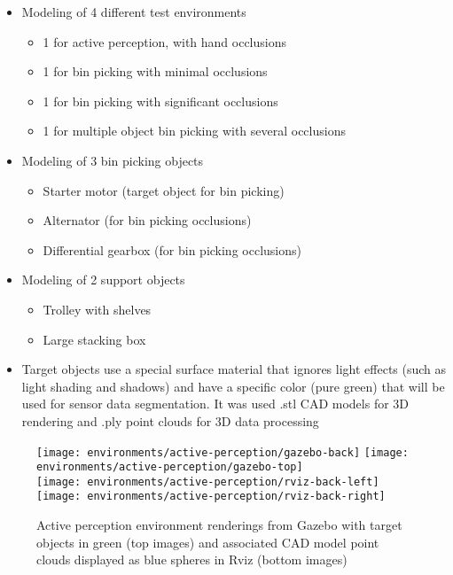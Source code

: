 \begin{itemize}
	\item Modeling of 4 different test environments
	\begin{itemize}
		\item 1 for active perception, with hand occlusions
		\item 1 for bin picking with minimal occlusions
		\item 1 for bin picking with significant occlusions
		\item 1 for multiple object bin picking with several occlusions
	\end{itemize}
	\item Modeling of 3 bin picking objects
	\begin{itemize}
		\item Starter motor (target object for bin picking)
		\item Alternator (for bin picking occlusions)
		\item Differential gearbox (for bin picking occlusions)
	\end{itemize}
	\item Modeling of 2 support objects
	\begin{itemize}
		\item Trolley with shelves
		\item Large stacking box
	\end{itemize}
	\item Target objects use a special surface material that ignores light effects (such as light shading and shadows) and have a specific color (pure green) that will be used for sensor data segmentation. It was used .stl CAD models for 3D rendering and .ply point clouds for 3D data processing
\end{itemize}

\begin{figure}
	\centering
	\texttt{[image: environments/active-perception/gazebo-back]}
	\texttt{[image: environments/active-perception/gazebo-top]}\\
	\texttt{[image: environments/active-perception/rviz-back-left]}
	\texttt{[image: environments/active-perception/rviz-back-right]}
	\caption{Active perception environment renderings from Gazebo with target objects in green (top images) and associated CAD model point clouds displayed as blue spheres in Rviz (bottom images)}
\end{figure}

